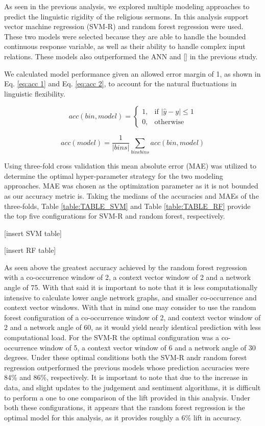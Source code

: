 \documentclass[11pt]{article}
\begin{document}
As seen in the previous analysis, we explored multiple modeling approaches to predict the linguistic rigidity of the religious sermons. In this analysis support vector machine regression (SVM-R) and random forest regression were used. These two models were selected because they are able to handle the bounded continuous response variable, as well as their ability to handle complex input relations. These models also outperformed the ANN and [] in the previous study.

We calculated model performance given an allowed error margin of 1, as shown in Eq. \ref{eq:acc 1} and Eq. \ref{eq:acc 2}, to account for the natural fluctuations in linguistic flexibility.

\begin{equation}
\label{eq:acc 1}
acc(bin, model) = 
\begin{cases} 
1, & \text{if } |\hat{y}-y| \leq 1 \\
0, & \text{otherwise}
\end{cases}
\end{equation}

\begin{equation}
\label{eq:acc 2}
acc(model) = \frac{1}{|bins|} \sum_{bin  \epsilon  bins} acc(bin, model)
\end{equation}

Using three-fold cross validation this mean absolute error (MAE) was utilized to determine the optimal hyper-parameter strategy for the two modeling approaches. MAE was chosen as the optimization parameter as it is not bounded as our accuracy metric is. Taking the medians of the accuracies and MAEs of the three-folds, Table \ref{table:TABLE_SVM} and Table \ref{table:TABLE_RF} provide the top five configurations for SVM-R and random forest, respectively.

[insert SVM table]

[insert RF table]

As seen above the greatest accuracy achieved by the random forest regression with a co-occurrence window of 2, a context vector window of 2 and a network angle of 75. With that said it is important to note that it is less computationally intensive to calculate lower angle network graphs, and smaller co-occurrence and context vector windows. With that in mind one may  consider to use the random forest configuration of a co-occurrence window of 2, and context vector window of 2 and a network angle of 60, as it would yield nearly identical prediction with less computational load. For the SVM-R the optimal configuration was a co-occurrence window of 5, a context vector window of 6 and a network angle of 30 degrees. Under these optimal conditions both the SVM-R andr random forest regression outperformed the previous models whose prediction accuracies were 84\% and 86\%, respectively. It is important to note that due to the increase in data, and slight updates to the judgement and sentiment algorithms, it is difficult to perform a one to one comparison of the lift provided in this analysis. Under both these configurations, it appears that the random forest regression is the optimal model for this analysis, as it provides roughly a 6\% lift in accuracy.
\end{document}
